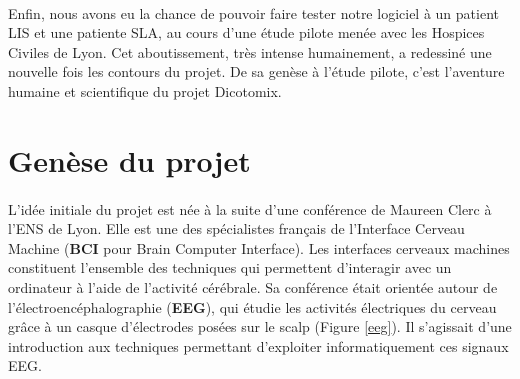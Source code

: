 \documentclass[11pt,a4paper]{article}
\theoremstyle{plain}
\theoremstyle{definition}
\begin{document}
\paragraph{} Enfin, nous avons eu la chance de pouvoir faire tester notre logiciel à un patient LIS et une patiente SLA, au cours d'une étude pilote menée avec les Hospices Civiles de Lyon.
Cet aboutissement, très intense humainement, a redessiné une nouvelle fois les contours du projet. De sa genèse à l'étude pilote, c'est l'aventure humaine et scientifique du projet Dicotomix.


\section{Genèse du projet}

\paragraph{} L'idée initiale du projet est née à la suite d'une conférence de Maureen Clerc à l'ENS de Lyon. Elle est une des spécialistes français de l'Interface Cerveau Machine (\textbf{BCI} pour Brain Computer Interface).
Les interfaces cerveaux machines constituent l'ensemble des techniques qui permettent d'interagir avec un ordinateur à l'aide de l'activité cérébrale. Sa conférence était orientée autour de l'électroencéphalographie (\textbf{EEG}), qui étudie les activités électriques du cerveau grâce à un casque d'électrodes posées sur le scalp (Figure \ref{eeg}). Il s'agissait d'une introduction aux techniques permettant d'exploiter informatiquement ces signaux EEG.
\end{document}
